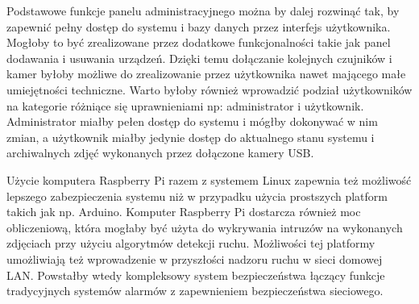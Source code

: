 \documentclass[a4paper,11pt,twoside]{article}
\begin{document}
Podstawowe funkcje panelu administracyjnego można by dalej rozwinąć tak, by zapewnić pełny dostęp do systemu i bazy danych przez interfejs użytkownika. Mogłoby to być zrealizowane przez dodatkowe funkcjonalności takie jak panel dodawania i usuwania urządzeń. Dzięki temu dołączanie kolejnych czujników i kamer byłoby możliwe do zrealizowanie przez użytkownika nawet mającego małe umiejętności techniczne. Warto byłoby również wprowadzić podział użytkowników na kategorie różniące się uprawnieniami np: administrator i użytkownik. Administrator miałby pełen dostęp do systemu i mógłby dokonywać w nim zmian, a użytkownik miałby jedynie dostęp do aktualnego stanu systemu i archiwalnych zdjęć wykonanych przez dołączone kamery USB.

Użycie komputera Raspberry Pi razem z systemem Linux zapewnia też możliwość lepszego zabezpieczenia systemu niż w przypadku użycia prostszych platform takich jak np. Arduino. Komputer Raspberry Pi dostarcza również moc obliczeniową, która mogłaby być użyta do wykrywania intruzów na wykonanych zdjęciach przy użyciu algorytmów detekcji ruchu. Możliwości tej platformy umożliwiają też wprowadzenie w przyszłości nadzoru ruchu w sieci domowej LAN. Powstałby wtedy kompleksowy system bezpieczeństwa łączący funkcje tradycyjnych systemów alarmów z zapewnieniem bezpieczeństwa sieciowego.



  

\newpage
\end{document}
